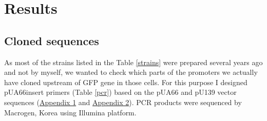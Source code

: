 \chapter{Results}

\shorthandoff{-} 

\section{Cloned  sequences}
As most of the strains listed in the Table \ref{strains} were prepared several years ago and not by myself, we wanted to check which parts of the promoters we actually have cloned upstream of GFP gene in those cells.
For this purpose I designed pUA66\textunderscore insert primers (Table \ref{pcr}) based on the pUA66 and pU139 vector sequences (\hyperlink{pUA66seq}{Appendix 1} and \hyperlink{pUA66seq}{Appendix 2}).
PCR products were sequenced by Macrogen, Korea using Illumina platform.


